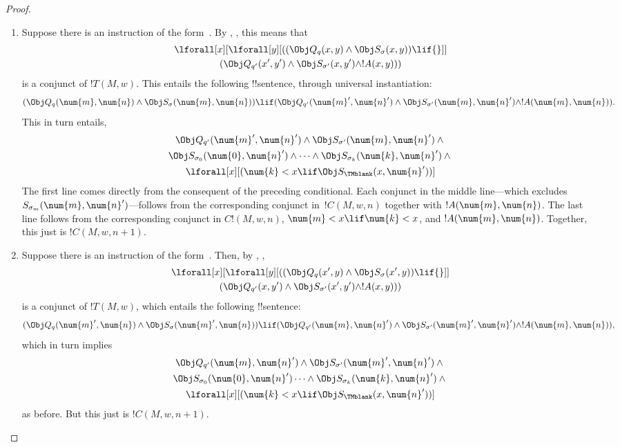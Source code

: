 \documentclass[../../../include/open-logic-section]{subfiles}
\begin{document}
\begin{proof}
\begin{enumerate} 
\item Suppose there is an instruction of the form~.
  By , , this means that
\begin{multline*} 
\lforall[x][\lforall[y][((\Obj Q_{q}(x,
    y) \land \Obj S_\sigma(x, y)) \lif {}]]\\
(\Obj Q_{q'}(x',
y') \land \Obj S_{\sigma'}(x, y') \land !A(x, y)))
\end{multline*} 
is a conjunct of $!T(M,w)$. This entails the following
!!{sentence}, through universal instantiation: 
\[ 
(\Obj Q_{q}(\num{m}, \num{n}) \land \Obj S_{\sigma}(\num{m}, \num{n}))
\lif (\Obj Q_{q'}(\num{m}', \num{n}') \land \Obj S_{\sigma'}(\num{m},
\num{n}') \land !A(\num{m}, \num{n})).
\]
This in turn entails,
\begin{multline*}
\Obj Q_{q'}(\num{m}', \num{n}') \land \Obj S_{\sigma'}(\num{m},
\num{n}') \land {}\\
\Obj S_{\sigma_0}(\num{0}, \num{n}') \land \dots \land
\Obj S_{\sigma_k}(\num{k}, \num{n}') \land {}\\
\lforall[x][(\num{k} < x
  \lif \Obj S_\TMblank(x, \num{n}'))]
\end{multline*}
The first line comes directly from the consequent of the preceding
conditional. Each conjunct in the middle line---which excludes
$S_{\sigma_m}(\num{m},\num{n}')$---follows from the corresponding
conjunct in~$!C(M, w, n)$ together with $!A(\num{m}, \num{n})$. The
last line follows from the corresponding conjunct in $C!(M, w, n)$,
$\num{m} < x \lif \num{k} < x$, and $!A(\num{m}, \num{n})$.  Together,
this just is $!C(M, w, n+1)$.

\item Suppose there is an instruction of the form~.
  Then, by , ,
\begin{multline*} 
\lforall[x][\lforall[y][((\Obj Q_{q}(x', y) \land \Obj
    S_{\sigma}(x', y)) \lif {}]]\\
(\Obj Q_{q'}(x, y') \land \Obj
S_{\sigma'}(x', y') \land !A(x, y)))
\end{multline*} 
is a conjunct of $!T(M,w)$, which entails the following !!{sentence}: 
\[ 
(\Obj Q_{q}(\num{m}', \num{n}) \land \Obj S_{\sigma}(\num{m}', \num{n}))
\lif (\Obj Q_{q'}(\num{m}, \num{n}') \land \Obj S_{\sigma'}(\num{m}',
\num{n}') \land !A(\num{m}, \num{n})),
\]
which in turn implies
\begin{multline*}
  \Obj Q_{q'}(\num{m}, \num{n}') \land \Obj S_{\sigma'}(\num{m}',
  \num{n}') \land {}\\
  \Obj S_{\sigma_0}(\num{0}, \num{n}')\dots \land
  \Obj S_{\sigma_k}(\num{k}, \num{n}')  \land {} \\
  \lforall[x][(\num{k} < x
  \lif \Obj S_\TMblank(x, \num{n}'))]
\end{multline*}
as before. But this just is $!C(M, w, n+1)$.


\end{enumerate}
\end{proof}
\end{document}
